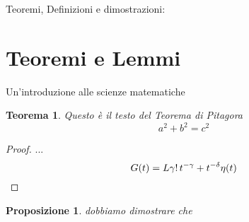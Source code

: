\documentclass[10pt]{article}
\begin{document}
\noindent
{\Huge Teoremi, Definizioni e dimostrazioni:}
\bigskip
\section{Teoremi e Lemmi}
Un'introduzione alle scienze matematiche
\newtheorem{thm}{Teorema}
\begin{thm}
	Questo è il testo del Teorema di Pitagora\\
	\[a^2 + b^2 = c^2\]
\end{thm}
\begin{proof} ... \begin{equation} G(t)=L\gamma!\,t^{-\gamma}+t^{-\delta}\eta(t) \qedhere \end{equation} \end{proof}
\newtheorem{prop}{Proposizione}[section]
\begin{prop}
	dobbiamo dimostrare che
\end{prop}
\end{document}
